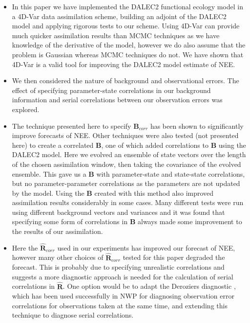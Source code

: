 \documentclass[11pt]{article}
\begin{document}
\begin{itemize}
\item In this paper we have implemented the DALEC2 functional ecology model in a 4D-Var data assimilation scheme, building an adjoint of the DALEC2 model and applying rigorous tests to our scheme. Using 4D-Var can provide much quicker assimilation results than MCMC techniques as we have knowledge of the derivative of the model, however we do also assume that the problem is Gaussian whereas MCMC techniques do not. We have shown that 4D-Var is a valid tool for improving the DALEC2 model estimate of NEE.

\item We then considered the nature of background and observational errors. The effect of specifying parameter-state correlations in our background information and serial correlations between our observation errors was explored.

\item The technique presented here to specify ${\mathbf{B}}_{corr}$ has been shown to significantly improve forecasts of NEE. Other techniques were also tested (not presented here) to create a correlated $\textbf{B}$, one of which added correlations to $\textbf{B}$ using the DALEC2 model. Here we evolved an ensemble of state vectors over the length of the chosen assimilation window, then taking the covariance of the evolved ensemble. This gave us a \textbf{B} with parameter-state and state-state correlations, but no parameter-parameter correlations as the parameters are not updated by the model. Using the $\textbf{B}$ created with this method also improved assimilation results considerably in some cases. Many different tests were run using different background vectors and variances and it was found that specifying some form of correlations in $\textbf{B}$ always made some improvement to the results of our assimilation.

\item Here the $\hat{\mathbf{R}}_{corr}$ used in our experiments has improved our forecast of NEE, however many other choices of $\hat{\mathbf{R}}_{corr}$ tested for this paper degraded the forecast. This is probably due to specifying unrealistic correlations and suggests a more diagnostic approach is needed for the calculation of serial correlations in $\hat{\mathbf{R}}$. One option would be to adapt the Deroziers diagnostic \citep{desroziers2005diagnosis}, which has been used successfully in NWP for diagnosing observation error correlations for observations taken at the same time, and extending this technique to diagnose serial correlations.


\end{itemize}
\end{document}
